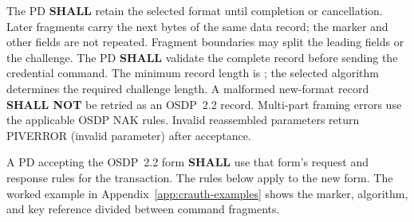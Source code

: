 The PD \textbf{SHALL} retain the selected format until completion or
cancellation. Later fragments carry the next bytes of the same data record;
the marker and other fields are not repeated. Fragment boundaries may split
the leading fields or the challenge. The PD \textbf{SHALL} validate the
complete record before sending the credential command. The minimum record
length is ; the selected algorithm determines the required
challenge length. A malformed new-format record \textbf{SHALL NOT} be
retried as an OSDP~2.2 record. Multi-part framing errors use the applicable
OSDP NAK rules. Invalid reassembled parameters return PIVERROR
 (invalid parameter) after acceptance.

A PD accepting the OSDP~2.2 form \textbf{SHALL} use that form's request
and response rules for the transaction. The rules below apply to the new form.
The worked example in Appendix~\ref{app:crauth-examples} shows the marker,
algorithm, and key reference divided between command fragments.

